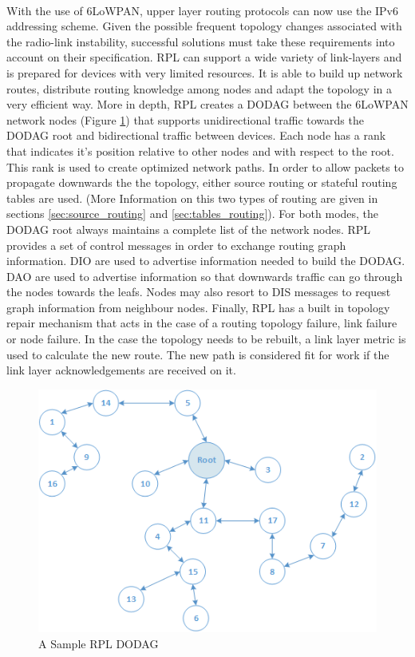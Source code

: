 \paragraph{}
With the use of 6LoWPAN, upper layer routing protocols can now use the IPv6 addressing scheme. Given the possible frequent topology changes associated with the radio-link instability, successful  solutions must take these requirements into account on their specification. RPL can support a wide variety of link-layers and is prepared for devices with very limited resources. It is able to build up network routes, distribute routing knowledge among nodes and adapt the topology in a very efficient way. More in depth, RPL creates a \ac{DODAG} between the 6LoWPAN network nodes (Figure \ref{fig:rpl_dodag}) that supports unidirectional traffic towards the \ac{DODAG} root and bidirectional traffic between devices. Each node has a rank that indicates it's position relative to other nodes and with respect to the root. This rank is used to create optimized network paths. In order to allow packets to propagate downwards the the topology, either source routing or stateful routing tables are used. (More Information on this two types of routing are given in sections \ref{sec:source_routing} and \ref{sec:tables_routing}). For both modes, the \ac{DODAG} root always maintains a complete list of the network nodes. RPL provides a set of control messages in order to exchange routing graph information. \ac{DIO} are used to advertise information needed to build the \ac{DODAG}. \ac{DAO}  are used to advertise information so that downwards traffic can go through the nodes towards the leafs. Nodes may also resort to \ac{DIS} messages to request graph information from neighbour nodes. Finally, RPL has a built in topology repair mechanism that acts in the case of a routing topology failure, link failure or node failure. In the case the topology needs to be rebuilt, a link layer metric is used to calculate the new route. The new path is considered fit for work if the link layer acknowledgements are received on it.

\begin{figure}[h]
  \centering
  \includegraphics[width=0.8\linewidth]{figures/RPL_DODAG.png}
  \caption{A Sample RPL DODAG}
  \label{fig:rpl_dodag}
\end{figure}

